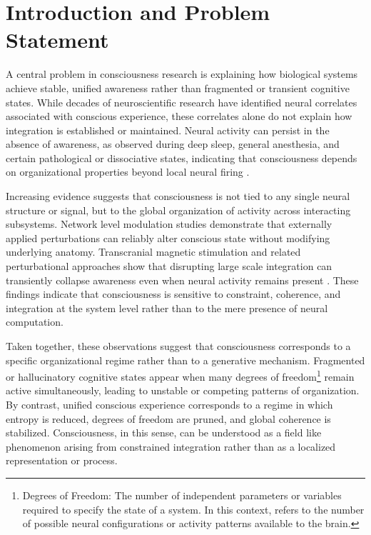 \documentclass[12pt,letterpaper]{article}
\begin{document}
\newpage
\tableofcontents
\newpage

\section{Introduction and Problem Statement}

A central problem in consciousness research is explaining how biological systems achieve stable, unified awareness rather than fragmented or transient cognitive states. While decades of neuroscientific research have identified neural correlates associated with conscious experience, these correlates alone do not explain how integration is established or maintained. Neural activity can persist in the absence of awareness, as observed during deep sleep, general anesthesia, and certain pathological or dissociative states, indicating that consciousness depends on organizational properties beyond local neural firing \cite{koch2019, tononi2016}.

Increasing evidence suggests that consciousness is not tied to any single neural structure or signal, but to the global organization of activity across interacting subsystems. Network level modulation studies demonstrate that externally applied perturbations can reliably alter conscious state without modifying underlying anatomy. Transcranial magnetic stimulation and related perturbational approaches show that disrupting large scale integration can transiently collapse awareness even when neural activity remains present \cite{massimini2005, casali2013}. These findings indicate that consciousness is sensitive to constraint, coherence, and integration at the system level rather than to the mere presence of neural computation.

Taken together, these observations suggest that consciousness corresponds to a specific organizational regime rather than to a generative mechanism. Fragmented or hallucinatory cognitive states appear when many degrees of freedom\footnote{Degrees of Freedom: The number of independent parameters or variables required to specify the state of a system. In this context, refers to the number of possible neural configurations or activity patterns available to the brain.} remain active simultaneously, leading to unstable or competing patterns of organization. By contrast, unified conscious experience corresponds to a regime in which entropy is reduced, degrees of freedom are pruned, and global coherence is stabilized. Consciousness, in this sense, can be understood as a field like phenomenon arising from constrained integration rather than as a localized representation or process.
\end{document}
